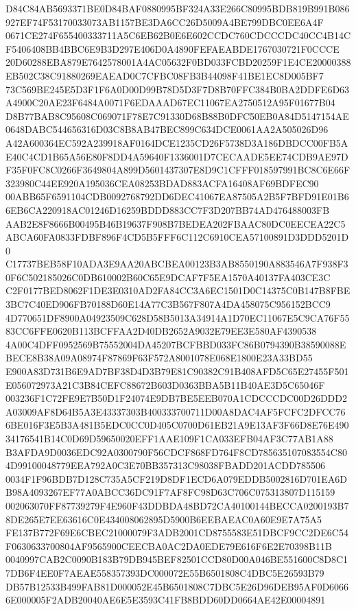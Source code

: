 \documentclass[UTF8,fontset=fandol,zihao=-4,a4paper]{ctexart}
\begin{document}
{{D84C84AB5693371BE0D84BAF0880995BF324A33E266C80995BDB819B991B086927EF74F53170033073AB1157BE3DA6CC26D5009A4BE799DBC0EE6A4F
0671CE274F655400333711A5C6EB62B0E6E602CCDC760CDCCCDC40CC4B14CF5406408BB4BBC6E9B3D297E406D0A4890FEFAEABDE1767030721F0CCCE
20D60288EBA879E7642578001A4AC05632F0BD033FCBD20259F1E4CE20000388EB502C38C91880269EAEAD0C7CFBC08FB3B44098F41BE1EC8D005BF7
73C569BE245E5D3F1F6A0D00D99B78D5D3F7D8B70FFC384B0BA2DDFE6D63A4900C20AE23F6484A0071F6EDAAAD67EC11067EA2750512A95F01677B04
D8B77BAB8C95608C069071F78E7C91330D68B88B0DFC50EB0A84D5147154AE0648DABC544656316D03C8B8AB47BEC899C634DCE0061AA2A505026D96
A42A600364EC592A239918AF0164DCE1235CD26F5738D3A186DBDCC00FB5AE40C4CD1B65A56E80F8DD4A59640F1336001D7CECAADE5EE74CDB9AE97D
F35F0FC8C0266F3649804A899D5601437307E8D9C1CFFF018597991BC8C6E66F323980C44EE920A195036CEA08253BDAD883ACFA16408AF69BDFEC90
00ABB65F6591104CDB0092768792DD6DEC41067EA87505A2B5F7BFD91E01B66EB6CA220918AC01246D16259BDDD883CC7F3D207BB74AD476488003FB
AAB2E8F8666B00495B46B19637F908B7BEDEA202FBAAC80DC0EECEA22C5ABCA60FA0833FDBF896F4CD5B5FFF6C112C6910CEA57100891D3DDD5201D0
C17737BEB58F10ADA3E9AA20ABCBEA00123B3AB8550190A883546A7F938F30F6C502185026C0DB610002B60C65E9DCAF7F5EA1570A40137FA403CE3C
C2F0177BED8062F1DE3E0310AD2FA84CC3A6EC1501D0C14375C0B147B8FBE3BC7C40ED906FB70188D60E14A77C3B567F807A4DA458075C956152BCC9
4D770651DF8900A04923509C628D58B5013A34914A1D70EC11067E5C9CA76F5583CC6FFE0620B113BCFFAA2D40DB2652A9032E79EE3E580AF4390538
4A00C4DFF0952569B75552004DA45207BCFBBD033FC86B0794390B38590088EBECE8B38A09A08974F87869F63F572A8001078E068E1800E23A33BD55
E900A83D731B6E9AD7BF38D4D3B79E81C90382C91B408AFD5C65E27455F501E056072973A21C3B84CEFC88672B603D0363BBA5B11B40AE3D5C65046F
003236F1C72FE9E7B50D1F24074E9DB7BE5EEB070A1CDCCCDC00D26DDD2A03009AF8D64B5A3E43337303B400333700711D00A8DAC4AF5FCFC2DFCC76
6BE016F3E5B3A481B5EDC0CC0D405C0700D61EB21A9E13AF3F66D8E76E49034176541B14C0D69D59650020EFF1AAE109F1CA033EFB04AF3C77AB1A88
B3AFDA9D0036EDC92A0300790F56CDCF868FD764F8CD785635107083554C804D99100048779EEA792A0C3E70BB357313C98038FBADD201ACDD785506
0034F1F96BDB7D128C735A5CF219D8DF1ECD6A079EDDB5002816D701EA6DB98A4093267EF77A0ABCC36DC91F7AF8FC98D63C706C075313807D115159
002063070FF87739279F4E960F43DDBDA48BD72CA40100144BECCA0200193B78DE265E7EE63616C0E434008062895D5900B6EEBAEAC0A60E9E7A75A5
FE137B772F69E6CBEC21000079F3ADB2001CD8755583E51DBCF9CC2DE6C54F0630633700804AF9565900CEECBA0AC2DA0EDE79E616F6E2E70398B11B
0040997CAB2C0090B183B79DB945BEF82501CCD80D00A046BE551600C8D8C17DB6F4EE0F7AEAE558357393DC000072E55B6501808C4DBC5E26593B79
DB57B12533B499FAB81D000052E45B6501808C7DBC5E26D96DEB95AF0D60666E000005F2ADB20040AE6E5E3593C41FB8BDD60DD0664AE42E00004891
}}
\end{document}
